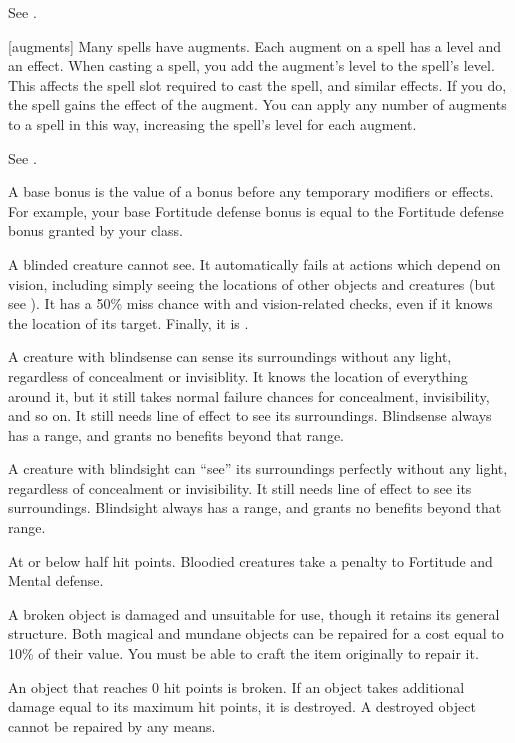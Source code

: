  See .

[augments] Many spells have augments.
Each augment on a spell has a level and an effect.
When casting a spell, you add the augment's level to the spell's level.
This affects the spell slot required to cast the spell, and similar effects.
If you do, the spell gains the effect of the augment.
You can apply any number of augments to a spell in this way, increasing the spell's level for each augment.

 See .

 A base bonus is the value of a bonus before any temporary modifiers or effects. For example, your base Fortitude defense bonus is equal to the Fortitude defense bonus granted by your class.

 A blinded creature cannot see. It automatically fails at actions which depend on vision, including simply seeing the locations of other objects and creatures (but see ). It has a 50\% miss chance with  and vision-related checks, even if it knows the location of its target. Finally, it is .

 A creature with blindsense can sense its surroundings without any light, regardless of concealment or invisiblity.
It knows the location of everything around it, but it still takes normal failure chances for concealment, invisibility, and so on.
It still needs line of effect to see its surroundings.
Blindsense always has a range, and grants no benefits beyond that range.

 A creature with blindsight can ``see'' its surroundings perfectly without any light, regardless of concealment or invisibility.
It still needs line of effect to see its surroundings.
Blindsight always has a range, and grants no benefits beyond that range.

 At or below half hit points. Bloodied creatures take a  penalty to Fortitude and Mental defense.

 A broken object is damaged and unsuitable for use, though it retains its general structure. Both magical and mundane objects can be repaired for a cost equal to 10\% of their value. You must be able to craft the item originally to repair it.

An object that reaches 0 hit points is broken. If an object takes additional damage equal to its maximum hit points, it is destroyed. A destroyed object cannot be repaired by any means.

